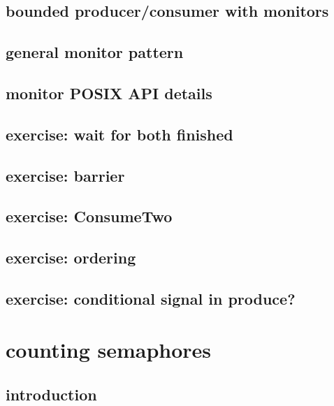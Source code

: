 \subsection{bounded producer/consumer with monitors}
 

\subsection{general monitor pattern}


\subsection{monitor POSIX API details}


\subsection{exercise: wait for both finished}


\subsection{exercise: barrier}


\subsection{exercise: ConsumeTwo}


\subsection{exercise: ordering}


\subsection{exercise: conditional signal in produce?}


\section{counting semaphores}

\subsection{introduction}

